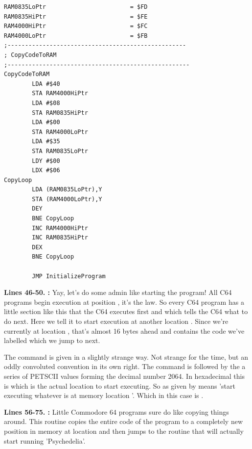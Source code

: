 \bigskip
\bigskip
\bigskip
\bigskip
\bigskip
\bigskip
\bigskip
\begin{lstlisting}[caption=Some strictly unnecessary code copying]
RAM0835LoPtr                        = $FD
RAM0835HiPtr                        = $FE
RAM4000HiPtr                        = $FC
RAM4000LoPtr                        = $FB
;---------------------------------------------------
; CopyCodeToRAM
;----------------------------------------------------
CopyCodeToRAM
        LDA #$40
        STA RAM4000HiPtr
        LDA #$08
        STA RAM0835HiPtr
        LDA #$00
        STA RAM4000LoPtr
        LDA #$35
        STA RAM0835LoPtr
        LDY #$00                                 
        LDX #$06
CopyLoop   
        LDA (RAM0835LoPtr),Y
        STA (RAM4000LoPtr),Y
        DEY 
        BNE CopyLoop
        INC RAM4000HiPtr
        INC RAM0835HiPtr
        DEX 
        BNE CopyLoop

        JMP InitializeProgram

\end{lstlisting}
\clearpage
{}
\textbf{Lines 46-50. :} Yay, let's do some admin like starting the program! All C64 programs 
begin execution at position , it's the law.
So every C64 program has a little section like this that the C64 executes first and which tells the C64 what to do next.
Here we tell it to start execution at another location . Since we're currently at location , that's
almost 16 bytes ahead and contains the code we've labelled  which we jump to next.

The command is given in a slightly strange way. Not strange for the time, but an oddly convoluted convention in its own right.
The  command is followed by the a series of PETSCII values forming the decimal number 2064. In hexadecimal this is
 which is the actual location to start executing. So  as given by 
means 'start executing whatever is at memory location '. Which in this case is .

\bigskip
\bigskip
\textbf{Lines 56-75. :} Little Commodore 64 programs sure do like copying things around. This routine copies the entire code of the program to a
completely new position in memory at location  and then jumps to the routine  that will actually start running
'Psychedelia'.

